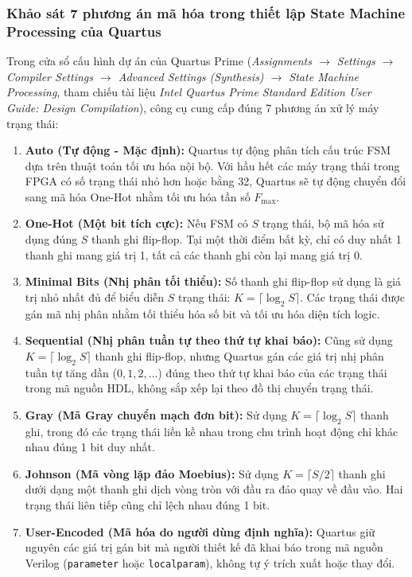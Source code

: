 \subsubsection*{Khảo sát 7 phương án mã hóa trong thiết lập State Machine Processing của Quartus}
Trong cửa sổ cấu hình dự án của Quartus Prime (\emph{Assignments $\to$ Settings $\to$ Compiler Settings $\to$ Advanced Settings (Synthesis) $\to$ State Machine Processing}, tham chiếu tài liệu \emph{Intel Quartus Prime Standard Edition User Guide: Design Compilation}), công cụ cung cấp đúng 7 phương án xử lý máy trạng thái:

\begin{enumerate}[leftmargin=1.5em, itemsep=3pt]
    \item \textbf{Auto (Tự động - Mặc định):} Quartus tự động phân tích cấu trúc FSM dựa trên thuật toán tối ưu hóa nội bộ. Với hầu hết các máy trạng thái trong FPGA có số trạng thái nhỏ hơn hoặc bằng 32, Quartus sẽ tự động chuyển đổi sang mã hóa One-Hot nhằm tối ưu hóa tần số $F_{\max}$.
    \item \textbf{One-Hot (Một bit tích cực):} Nếu FSM có $S$ trạng thái, bộ mã hóa sử dụng đúng $S$ thanh ghi flip-flop. Tại một thời điểm bất kỳ, chỉ có duy nhất 1 thanh ghi mang giá trị 1, tất cả các thanh ghi còn lại mang giá trị 0.
    \item \textbf{Minimal Bits (Nhị phân tối thiểu):} Số thanh ghi flip-flop sử dụng là giá trị nhỏ nhất đủ để biểu diễn $S$ trạng thái: $K = \lceil \log_2 S \rceil$. Các trạng thái được gán mã nhị phân nhằm tối thiểu hóa số bit và tối ưu hóa diện tích logic.
    \item \textbf{Sequential (Nhị phân tuần tự theo thứ tự khai báo):} Cũng sử dụng $K = \lceil \log_2 S \rceil$ thanh ghi flip-flop, nhưng Quartus gán các giá trị nhị phân tuần tự tăng dần ($0, 1, 2, \dots$) đúng theo thứ tự khai báo của các trạng thái trong mã nguồn HDL, không sắp xếp lại theo đồ thị chuyển trạng thái.
    \item \textbf{Gray (Mã Gray chuyển mạch đơn bit):} Sử dụng $K = \lceil \log_2 S \rceil$ thanh ghi, trong đó các trạng thái liền kề nhau trong chu trình hoạt động chỉ khác nhau đúng 1 bit duy nhất.
    \item \textbf{Johnson (Mã vòng lặp đảo Moebius):} Sử dụng $K = \lceil S / 2 \rceil$ thanh ghi dưới dạng một thanh ghi dịch vòng tròn với đầu ra đảo quay về đầu vào. Hai trạng thái liên tiếp cũng chỉ lệch nhau đúng 1 bit.
    \item \textbf{User-Encoded (Mã hóa do người dùng định nghĩa):} Quartus giữ nguyên các giá trị gán bit mà người thiết kế đã khai báo trong mã nguồn Verilog (\texttt{parameter} hoặc \texttt{localparam}), không tự ý trích xuất hoặc thay đổi.
\end{enumerate}

